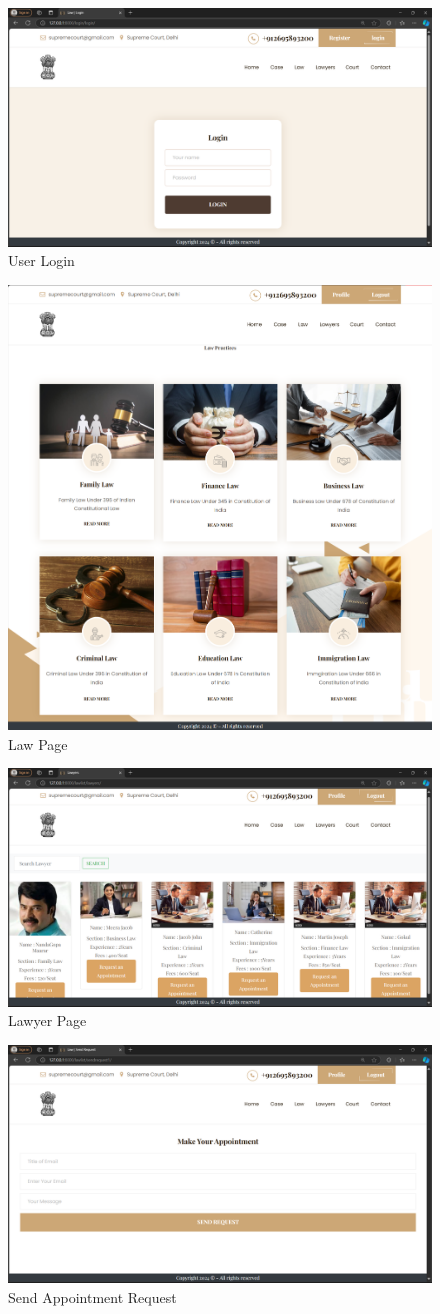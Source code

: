 \begin{figure}
  \centering
  \includegraphics[width=0.5\linewidth]{login.png}
 \caption{User Login}
   \label{fig:User Login}
\end{figure}

\begin{figure}
  \centering
  \includegraphics[width=0.5\linewidth]{lawpage.png}
 \caption{Law Page}
   \label{fig:Law Page}
\end{figure}

\begin{figure}
  \centering
  \includegraphics[width=0.5\linewidth]{lawyers.png}
 \caption{Lawyer Page}
   \label{fig:Lawyer Page}
\end{figure}

\begin{figure}
  \centering
  \includegraphics[width=0.5\linewidth]{sendrequest.png}
 \caption{Send Appointment Request}
   \label{fig:Send Appointment Request}
\end{figure}

